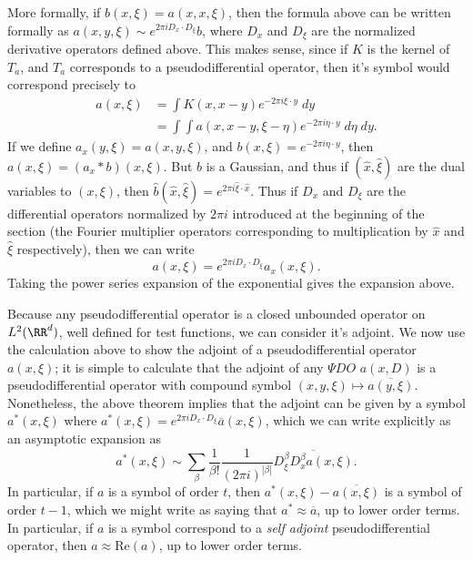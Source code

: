 \begin{remark}
    More formally, if $b(x,\xi) = a(x,x,\xi)$, then the formula above can be written formally as $a(x,y,\xi) \sim e^{2 \pi i D_x \cdot D_\xi} b$, where $D_x$ and $D_\xi$ are the normalized derivative operators defined above. This makes sense, since if $K$ is the kernel of $T_a$, and $T_a$ corresponds to a pseudodifferential operator, then it's symbol would correspond precisely to
    \begin{align*}
        a(x,\xi) &= \int K(x, x - y) e^{-2 \pi i \xi \cdot y}\; dy\\
        &= \int \int a(x,x-y,\xi-\eta) e^{- 2 \pi i \eta \cdot y}\; d\eta\; dy.
    \end{align*}
    If we define $a_x(y,\xi) = a(x,y,\xi)$, and $b(x,\xi) = e^{-2 \pi i \eta \cdot y}$, then $a(x,\xi) = (a_x * b)(x,\xi)$. But $b$ is a Gaussian, and thus if $(\widehat{x}, \widehat{\xi})$ are the dual variables to $(x,\xi)$, then $\widehat{b}(\widehat{x}, \widehat{\xi}) = e^{2 \pi i \widehat{\xi} \cdot \widehat{x}}$. Thus if $D_x$ and $D_\xi$ are the differential operators normalized by $2\pi i$ introduced at the beginning of the section (the Fourier multiplier operators corresponding to multiplication by $\widehat{x}$ and $\widehat{\xi}$ respectively), then we can write
    \[ a(x,\xi) = e^{2 \pi i D_x \cdot D_\xi} a_x(x,\xi). \]
    Taking the power series expansion of the exponential gives the expansion above.
\end{remark}

Because any pseudodifferential operator is a closed unbounded operator on $L^2(\RR^d)$, well defined for test functions, we can consider it's adjoint. We now use the calculation above to show the adjoint of a pseudodifferential operator $a(x,\xi)$; it is simple to calculate that the adjoint of any $\Psi DO$ $a(x,D)$ is a pseudodifferential operator with compound symbol $(x,y,\xi) \mapsto \overline{a(y,\xi)}$. Nonetheless, the above theorem implies that the adjoint can be given by a symbol $a^*(x,\xi)$ where $a^*(x,\xi) = e^{2 \pi i D_x \cdot D_\xi} \overline{a}(x,\xi)$, which we can write explicitly as an asymptotic expansion as
%
\[ a^*(x,\xi) \sim \sum_\beta \frac{1}{\beta!} \frac{1}{(2 \pi i)^{|\beta|}} \overline{D^\beta_\xi D^\beta_x a(x,\xi)}. \]
%
In particular, if $a$ is a symbol of order $t$, then $a^*(x,\xi) - \overline{a(x,\xi)}$ is a symbol of order $t - 1$, which we might write as saying that $a^* \approx \overline{a}$, up to lower order terms. In particular, if $a$ is a symbol correspond to a \emph{self adjoint} pseudodifferential operator, then $a \approx \text{Re}(a)$, up to lower order terms.

